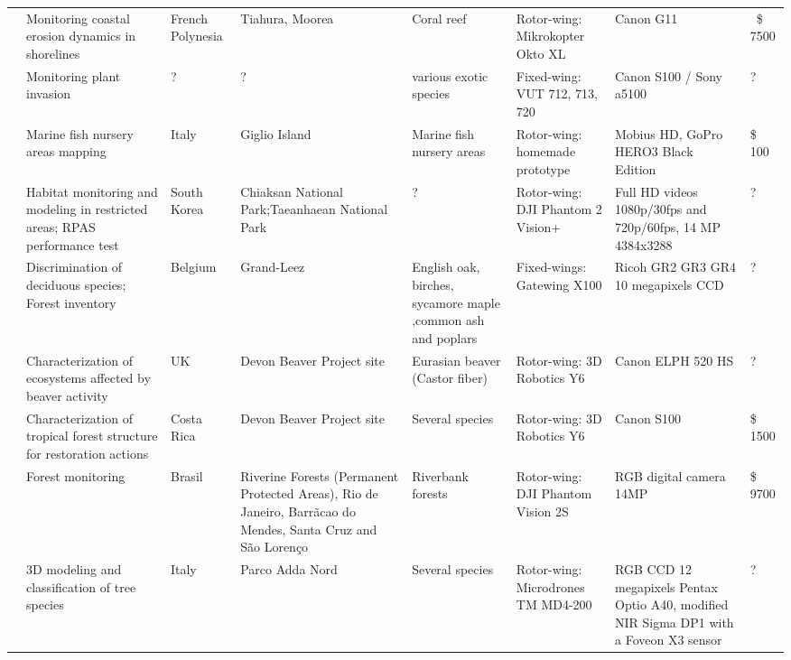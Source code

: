 \begin{landscape}
\begin{longtabu}{p{1.5cm}p{3cm}p{1cm}p{1.5cm}p{3cm}p{4cm}p{3.5cm}p{1cm}}
\cite{casella_drones_2016}  &  Monitoring coastal erosion dynamics in shorelines & French Polynesia & Tiahura, Moorea & Coral reef  & Rotor-wing: Mikrokopter Okto XL & Canon G11  & \ \$ 7500 \\ 

\cite{mullerova_does_2016}  &  Monitoring plant invasion & ? & ? & various exotic species  & Fixed-wing: VUT 712, 713, 720  & Canon S100 / Sony a5100  & ? \\ 

\cite{ventura_low-cost_2016}  & Marine fish nursery areas mapping  & Italy & Giglio Island & Marine fish nursery areas  & Rotor-wing: homemade prototype & Mobius HD, GoPro HERO3 Black Edition  &  \$ 100 \\ 

\cite{ivosevic_use_2015}  & Habitat monitoring and modeling in restricted areas; RPAS performance test & South Korea & Chiaksan National Park;Taeanhaean National Park &  ? & Rotor-wing: DJI Phantom 2 Vision+  & Full HD videos 1080p/30fps and 720p/60fps, 14 MP 4384x3288 & ? \\ 
\cite{lisein_discrimination_2015}  & Discrimination of deciduous species; Forest inventory & Belgium & Grand-Leez & English oak, birches, sycamore maple ,common ash and poplars & Fixed-wings: Gatewing X100  & Ricoh GR2 GR3 GR4 10 megapixels CCD  & ?  \\ 
  
\cite{puttock_aerial_2015}  & Characterization of ecosystems affected by beaver activity & UK & Devon Beaver Project site & Eurasian beaver (Castor fiber) & Rotor-wing: 3D Robotics Y6 & Canon ELPH 520 HS  & ?  \\ 
  
  \cite{zahawi_using_2015} & Characterization of tropical forest structure for restoration actions & Costa Rica & Devon Beaver Project site & Several species & Rotor-wing: 3D Robotics Y6 & Canon S100  &  \$ 1500 \\ 
  
\cite{bustamante_forest_2015}  & Forest monitoring & Brasil & Riverine Forests (Permanent Protected Areas), Rio de Janeiro, Barrãcao do Mendes, Santa Cruz and São Lorenço & Riverbank forests & Rotor-wing: DJI Phantom Vision 2S   & RGB digital camera 14MP &  \$ 9700  \\ 
  
\cite{gini_aerial_2012}  & 3D modeling and classification of tree species & Italy & Parco Adda Nord &  Several species &  Rotor-wing: Microdrones TM MD4-200 & RGB CCD 12 megapixels Pentax Optio A40, modified NIR Sigma DP1 with a Foveon X3 sensor  & ?  \\


\end{longtabu}
\end{landscape}
